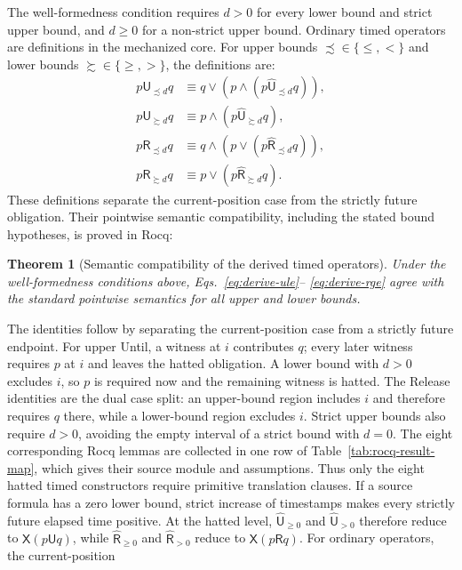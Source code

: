 \documentclass{ieeeaccess}
\newtheorem{theorem}{Theorem}[section]
\newcommand{\Until}{\mathbin{\mathsf{U}}}
\newcommand{\Release}{\mathbin{\mathsf{R}}}
\newcommand{\hUntil}{\mathbin{\widehat{\mathsf{U}}}}
\newcommand{\hRelease}{\mathbin{\widehat{\mathsf{R}}}}
\newcommand{\Next}{\mathsf{X}}
\begin{document}
The well-formedness condition requires $d>0$ for every lower bound and strict
upper bound, and $d\ge0$ for a non-strict upper bound. Ordinary timed
operators are definitions in the mechanized core. For upper bounds
$\precsim\in\{\le,<\}$ and lower bounds $\succsim\in\{\ge,>\}$, the definitions are:
\begin{align}
p\Until_{\precsim d}q &\equiv q\lor(p\land(p\hUntil_{\precsim d}q)),\label{eq:derive-ule}\\
p\Until_{\succsim d}q &\equiv p\land(p\hUntil_{\succsim d}q),\label{eq:derive-uge}\\
p\Release_{\precsim d}q &\equiv q\land(p\lor(p\hRelease_{\precsim d}q)),\label{eq:derive-rle}\\
p\Release_{\succsim d}q &\equiv p\lor(p\hRelease_{\succsim d}q).\label{eq:derive-rge}
\end{align}
These definitions separate the current-position case from the strictly future
obligation. Their pointwise semantic compatibility, including the stated
bound hypotheses, is proved in Rocq:
\begin{theorem}[Semantic compatibility of the derived timed operators]
\label{thm:derived-semantic-compatibility}
Under the well-formedness conditions above, Eqs.~\eqref{eq:derive-ule}--
\eqref{eq:derive-rge} agree with the standard pointwise semantics for all upper and lower bounds.
\end{theorem}
The identities follow by separating the current-position case from a
strictly future endpoint. For upper Until, a witness at $i$ contributes
$q$; every later witness requires $p$ at $i$ and leaves the hatted
obligation. A lower bound with $d>0$ excludes $i$, so $p$ is required now
and the remaining witness is hatted. The Release identities are the dual
case split: an upper-bound region includes $i$ and therefore requires $q$
there, while a lower-bound region excludes $i$. Strict upper bounds also
require $d>0$, avoiding the empty interval of a strict bound with $d=0$. The eight corresponding
Rocq lemmas are collected in one row of Table~\ref{tab:rocq-result-map},
which gives their source module and assumptions.
Thus only
the eight hatted timed constructors require primitive translation clauses.
If a source formula has a zero lower bound, strict increase of timestamps
makes every strictly future elapsed time positive. At the hatted level,
$\hUntil_{\ge0}$ and $\hUntil_{>0}$ therefore reduce to
$\Next(p\Until q)$, while $\hRelease_{\ge0}$ and $\hRelease_{>0}$
reduce to $\Next(p\Release q)$. For ordinary operators, the current-position
\end{document}
